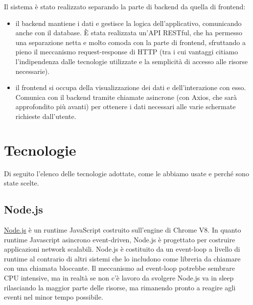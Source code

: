 \documentclass[a4paper,12pt]{report}
\newcommand{\node}{\href{https://nodejs.org/it/}{Node.js} }
\begin{document}
Il sistema è stato realizzato separando la parte di backend da quella di frontend:
\begin{itemize}
    \item il backend mantiene i dati e gestisce la logica dell'applicativo, comunicando anche con il database. È stata realizzata un'API RESTful, che ha permesso una separazione netta e molto comoda con la parte di frontend, sfruttando a pieno il meccanismo request-response di HTTP (tra i cui vantaggi citiamo l'indipendenza dalle tecnologie utilizzate e la semplicità di accesso alle risorse necessarie).
    \item il frontend si occupa della visualizzazione dei dati e dell'interazione con esso. Comunica con il backend tramite chiamate asincrone (con Axios, che sarà approfondito più avanti) per ottenere i dati necessari alle varie schermate richieste dall'utente.
\end{itemize}

\clearpage
\chapter{Tecnologie}\label{sec:technologies}
Di seguito l'elenco delle tecnologie adottate, come le abbiamo usate e perché sono state scelte.
\section{Node.js}
\node è un runtime JavaScript costruito sull'engine di Chrome V8. In quanto runtime Javascript asincrono event-driven, Node.js è progettato per costruire applicazioni network scalabili. Node.js è costituito da un event-loop a livello di runtime al contrario di altri sistemi che lo includono come libreria da chiamare con una chiamata bloccante. Il meccanismo ad event-loop potrebbe sembrare CPU intensive, ma in realtà se non c'è lavoro da svolgere Node.js va in sleep rilasciando la maggior parte delle risorse, ma rimanendo pronto a reagire agli eventi nel minor tempo possibile.
\end{document}

